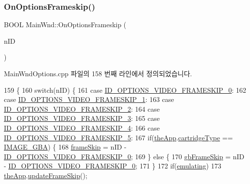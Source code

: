 \subsubsection{\texorpdfstring{On\+Options\+Frameskip()}{OnOptionsFrameskip()}}
{\footnotesize\ttfamily B\+O\+OL Main\+Wnd\+::\+On\+Options\+Frameskip (\begin{DoxyParamCaption}\item[{U\+I\+NT}]{n\+ID }\end{DoxyParamCaption})}



Main\+Wnd\+Options.\+cpp 파일의 158 번째 라인에서 정의되었습니다.


\begin{DoxyCode}
159 \{
160   \textcolor{keywordflow}{switch}(nID) \{
161   \textcolor{keywordflow}{case} \mbox{\hyperlink{resource_8h_a44b664edd91b8be18e6e8c7c4232e276}{ID\_OPTIONS\_VIDEO\_FRAMESKIP\_0}}:
162   \textcolor{keywordflow}{case} \mbox{\hyperlink{resource_8h_a1ddbccb5c540d0bfbc475d14bef12d1b}{ID\_OPTIONS\_VIDEO\_FRAMESKIP\_1}}:
163   \textcolor{keywordflow}{case} \mbox{\hyperlink{resource_8h_af8547802923e1c28eeaff5b9a2a8e7d6}{ID\_OPTIONS\_VIDEO\_FRAMESKIP\_2}}:
164   \textcolor{keywordflow}{case} \mbox{\hyperlink{resource_8h_aef4221179071cc92c27a89310f7377ed}{ID\_OPTIONS\_VIDEO\_FRAMESKIP\_3}}:
165   \textcolor{keywordflow}{case} \mbox{\hyperlink{resource_8h_ab6190f1b20c468dd81be59d2318762c7}{ID\_OPTIONS\_VIDEO\_FRAMESKIP\_4}}:
166   \textcolor{keywordflow}{case} \mbox{\hyperlink{resource_8h_aadbfdc0ea3e31bcac55ea819ede01c06}{ID\_OPTIONS\_VIDEO\_FRAMESKIP\_5}}:
167     \textcolor{keywordflow}{if}(\mbox{\hyperlink{_v_b_a_8cpp_a8095a9d06b37a7efe3723f3218ad8fb3}{theApp}}.\mbox{\hyperlink{class_v_b_a_af300759fcbc7eeb00ce73f956fc5ddb7}{cartridgeType}} == \mbox{\hyperlink{_util_8h_aef8b88d56fdf9a25f990a68d80c014d8a25f0ac1f3a37d568346fedece32e4bfb}{IMAGE\_GBA}}) \{
168       \mbox{\hyperlink{_globals_8cpp_a668e22999d7fcea3ed14130fd680b795}{frameSkip}} = nID - \mbox{\hyperlink{resource_8h_a44b664edd91b8be18e6e8c7c4232e276}{ID\_OPTIONS\_VIDEO\_FRAMESKIP\_0}};
169     \} \textcolor{keywordflow}{else} \{
170       \mbox{\hyperlink{_g_b_8cpp_a2139360d32d74969f470ef05414ecaf8}{gbFrameSkip}} = nID - \mbox{\hyperlink{resource_8h_a44b664edd91b8be18e6e8c7c4232e276}{ID\_OPTIONS\_VIDEO\_FRAMESKIP\_0}};
171     \}
172     \textcolor{keywordflow}{if}(\mbox{\hyperlink{_main_wnd_options_8cpp_af9cc36078b1b311753963297ae7f2a74}{emulating}})
173       \mbox{\hyperlink{_v_b_a_8cpp_a8095a9d06b37a7efe3723f3218ad8fb3}{theApp}}.\mbox{\hyperlink{class_v_b_a_a2b3524193d398b041e90907430361ed8}{updateFrameSkip}}();

\end{DoxyCode}
